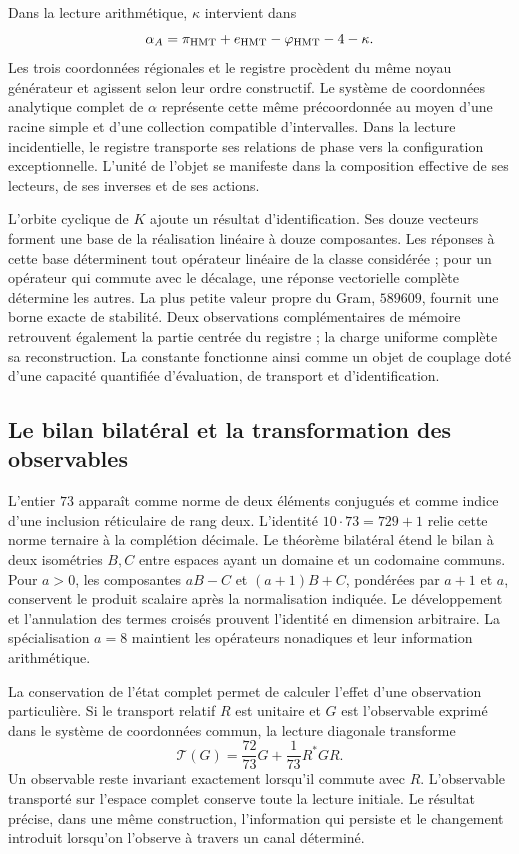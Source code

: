 Dans la lecture arithmétique, \(\kappa\) intervient dans
\[
\alpha_A=\pi_{\rm HMT}+e_{\rm HMT}-\varphi_{\rm HMT}-4-\kappa.
\]
Les trois coordonnées régionales et le registre procèdent du même noyau générateur et agissent selon leur ordre constructif. Le système de coordonnées analytique complet de \(\alpha\) représente cette même précoordonnée au moyen d’une racine simple et d’une collection compatible d’intervalles. Dans la lecture incidentielle, le registre transporte ses relations de phase vers la configuration exceptionnelle. L’unité de l’objet se manifeste dans la composition effective de ses lecteurs, de ses inverses et de ses actions.

L’orbite cyclique de \(K\) ajoute un résultat d’identification. Ses douze vecteurs forment une base de la réalisation linéaire à douze composantes. Les réponses à cette base déterminent tout opérateur linéaire de la classe considérée ; pour un opérateur qui commute avec le décalage, une réponse vectorielle complète détermine les autres. La plus petite valeur propre du Gram, \(589609\), fournit une borne exacte de stabilité. Deux observations complémentaires de mémoire retrouvent également la partie centrée du registre ; la charge uniforme complète sa reconstruction. La constante fonctionne ainsi comme un objet de couplage doté d’une capacité quantifiée d’évaluation, de transport et d’identification.

\subsection*{Le bilan bilatéral et la transformation des observables
}
L’entier \(73\) apparaît comme norme de deux éléments conjugués et comme indice d’une inclusion réticulaire de rang deux. L’identité \(10\cdot73=729+1\) relie cette norme ternaire à la complétion décimale. Le théorème bilatéral étend le bilan à deux isométries \(B,C\) entre espaces ayant un domaine et un codomaine communs. Pour \(a>0\), les composantes \(aB-C\) et \((a+1)B+C\), pondérées par \(a+1\) et \(a\), conservent le produit scalaire après la normalisation indiquée. Le développement et l’annulation des termes croisés prouvent l’identité en dimension arbitraire. La spécialisation \(a=8\) maintient les opérateurs nonadiques et leur information arithmétique.


La conservation de l’état complet permet de calculer l’effet d’une observation particulière. Si le transport relatif \(R\) est unitaire et \(G\) est l’observable exprimé dans le système de coordonnées commun, la lecture diagonale transforme
\[
\mathcal T(G)=\frac{72}{73}G+\frac1{73}R^*GR.
\]
Un observable reste invariant exactement lorsqu’il commute avec \(R\). L’observable transporté sur l’espace complet conserve toute la lecture initiale. Le résultat précise, dans une même construction, l’information qui persiste et le changement introduit lorsqu’on l’observe à travers un canal déterminé.

